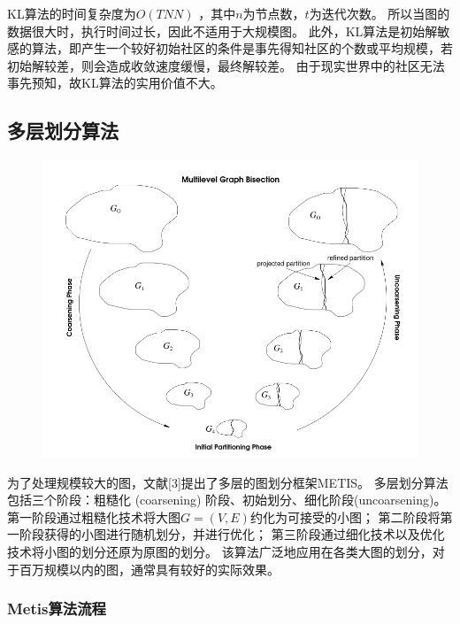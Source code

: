 KL算法的时间复杂度为$O(TNN)$ ，其中$n$为节点数，$t$为迭代次数。
所以当图的数据很大时，执行时间过长，因此不适用于大规模图。
此外，KL算法是初始解敏感的算法，即产生一个较好初始社区的条件是事先得知社区的个数或平均规模，若初始解较差，则会造成收敛速度缓慢，最终解较差。
由于现实世界中的社区无法事先预知，故KL算法的实用价值不大。

\subsection{多层划分算法}

\begin{figure}[htbp]
    \centering
    \includegraphics[width=0.75\linewidth]{figure/metis.png}
    \caption{}
    \label{}
\end{figure}

为了处理规模较大的图，文献[3]提出了多层的图划分框架METIS。
多层划分算法包括三个阶段：粗糙化 (coarsening) 阶段、初始划分、细化阶段(uncoarsening)。
第一阶段通过粗糙化技术将大图$G=(V,E)$约化为可接受的小图；
第二阶段将第一阶段获得的小图进行随机划分，并进行优化；
第三阶段通过细化技术以及优化技术将小图的划分还原为原图的划分。
该算法广泛地应用在各类大图的划分，对于百万规模以内的图，通常具有较好的实际效果。

\subsubsection{Metis算法流程}

